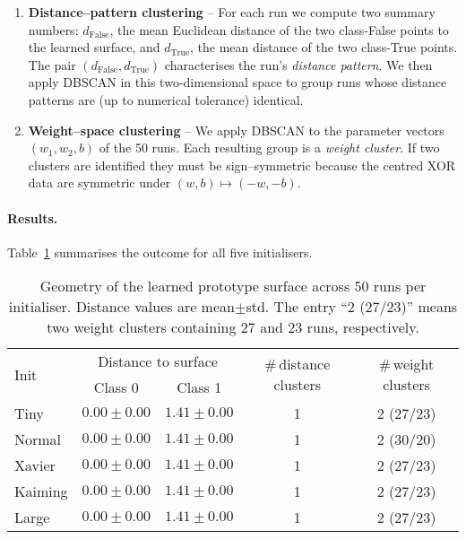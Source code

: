 \begin{enumerate}[label=(G\arabic*)]
    \item \textbf{Distance–pattern clustering} –  
        For each run we compute two summary numbers:  
        \(d_{\text{False}}\), the mean Euclidean distance of the two
        class-False points to the learned surface, and  
        \(d_{\text{True}}\), the mean distance of the two class-True points.
        The pair \((d_{\text{False}}, d_{\text{True}})\) characterises the
        run’s \emph{distance pattern}.  
        We then apply DBSCAN in this two-dimensional space to group runs whose
        distance patterns are (up to numerical tolerance) identical.
    \item \textbf{Weight–space clustering} –  
          We apply DBSCAN to the parameter vectors $(w_1,w_2,b)$ of the 50
          runs.  Each resulting group is a \emph{weight cluster}.  If two
          clusters are identified they must be sign–symmetric because the
          centred XOR data are symmetric under $(w,b)\!\mapsto\!(-w,-b)$.
\end{enumerate}

\paragraph{Results.}
Table~\ref{tab:init-geometry} summarises the outcome for all five
initialisers.

\begin{table}[h]
\centering
\caption{Geometry of the learned prototype surface across 50 runs per
initialiser.  Distance values are mean$\pm$std.  The entry
“2 (27/23)” means two weight clusters containing 27 and 23 runs, respectively.}
\label{tab:init-geometry}
\begin{tabular}{lcccc}
\toprule
\multirow{2}{*}{Init} &
\multicolumn{2}{c}{Distance to surface} &
\multirow{2}{*}{\#\,distance clusters} &
\multirow{2}{*}{\#\,weight clusters} \\
\cmidrule(lr){2-3}
 & Class 0 & Class 1 & & \\
\midrule
Tiny    & $0.00\pm0.00$ & $1.41\pm0.00$ & 1 & 2 (27/23) \\
Normal  & $0.00\pm0.00$ & $1.41\pm0.00$ & 1 & 2 (30/20) \\
Xavier  & $0.00\pm0.00$ & $1.41\pm0.00$ & 1 & 2 (27/23) \\
Kaiming & $0.00\pm0.00$ & $1.41\pm0.00$ & 1 & 2 (27/23) \\
Large   & $0.00\pm0.00$ & $1.41\pm0.00$ & 1 & 2 (27/23) \\
\bottomrule
\end{tabular}
\end{table}

